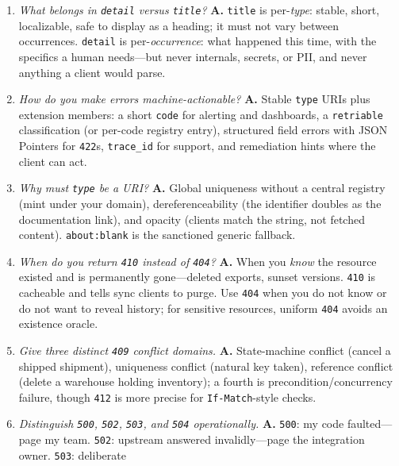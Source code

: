 \begin{enumerate}[label=\textbf{Q\arabic*.}, leftmargin=3.2em, start=9]
  \item \emph{What belongs in \texttt{detail} versus \texttt{title}?}
        \textbf{A.} \texttt{title} is per-\emph{type}: stable, short,
        localizable, safe to display as a heading; it must not vary between
        occurrences. \texttt{detail} is per-\emph{occurrence}: what happened
        this time, with the specifics a human needs---but never internals,
        secrets, or PII, and never anything a client would parse.
  \item \emph{How do you make errors machine-actionable?} \textbf{A.}
        Stable \texttt{type} URIs plus extension members: a short
        \texttt{code} for alerting and dashboards, a \texttt{retriable}
        classification (or per-code registry entry), structured field errors
        with JSON Pointers for \texttt{422}s, \texttt{trace\_id} for
        support, and remediation hints where the client can act.
  \item \emph{Why must \texttt{type} be a URI?} \textbf{A.} Global
        uniqueness without a central registry (mint under your domain),
        dereferenceability (the identifier doubles as the documentation
        link), and opacity (clients match the string, not fetched content).
        \texttt{about:blank} is the sanctioned generic fallback.
  \item \emph{When do you return \texttt{410} instead of \texttt{404}?}
        \textbf{A.} When you \emph{know} the resource existed and is
        permanently gone---deleted exports, sunset versions. \texttt{410} is
        cacheable and tells sync clients to purge. Use \texttt{404} when you
        do not know or do not want to reveal history; for sensitive
        resources, uniform \texttt{404} avoids an existence oracle.
  \item \emph{Give three distinct \texttt{409} conflict domains.}
        \textbf{A.} State-machine conflict (cancel a shipped shipment),
        uniqueness conflict (natural key taken), reference conflict (delete
        a warehouse holding inventory); a fourth is precondition/concurrency
        failure, though \texttt{412} is more precise for
        \texttt{If-Match}-style checks.
  \item \emph{Distinguish \texttt{500}, \texttt{502}, \texttt{503}, and
        \texttt{504} operationally.} \textbf{A.} \texttt{500}: my code
        faulted---page my team. \texttt{502}: upstream answered
        invalidly---page the integration owner. \texttt{503}: deliberate

\end{enumerate}
